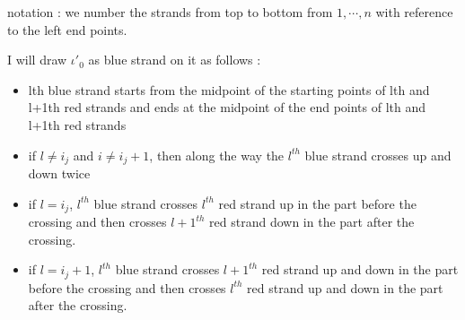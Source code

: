 notation : we number the strands from top to bottom from $1,\cdots,n$ with reference to the left end points.


I will draw $\iota'_0$ as blue strand on it as follows :
\begin{itemize}
\item lth blue strand starts from the midpoint of the starting points of lth and l+1th red strands and ends at the midpoint of the end points of lth and l+1th red strands

\item if $l \neq i_j$ and $i\neq i_j +1$, then along the way the $l^{th}$ blue strand crosses up and down twice

\item if $l = i_j$, $l^{th}$ blue strand crosses $l^{th}$ red strand up in the part before the crossing and then crosses $l+1^{th}$ red strand down in the part after the crossing.

\item if $l = i_j + 1$, $l^{th}$ blue strand crosses $l+1^{th}$ red strand up and down in the part before the crossing and then crosses $l^{th}$ red strand up and down in the part after the crossing.
\end{itemize}

